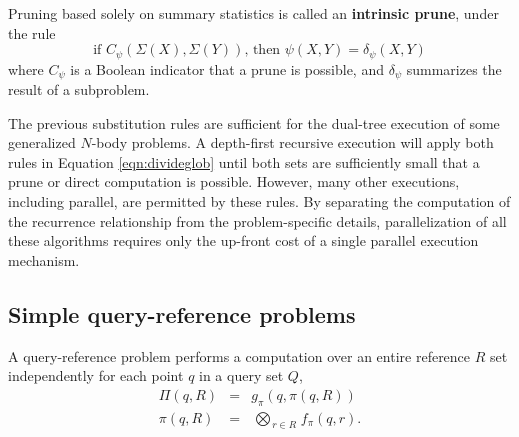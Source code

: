 \documentclass[times, 10pt,twocolumn]{article}
\newcommand{\defterm}[1]{{\bf #1}}
\newcommand{\myOp}[1]{\mathop{\bigotimes\nolimits\!\!_{#1}}}
\newcommand{\letterglob}{\psi}
\newcommand{\inglob}{\psi}
\newcommand{\canpruneglob}{C_{\letterglob}}
\newcommand{\deltaglob}{\delta_{\letterglob}}
\newcommand{\letterqr}{\pi}
\newcommand{\outqr}{\Pi}
\newcommand{\inqr}{\pi}
\newcommand{\Opqr}{\myOp{\letterqr}}
\newcommand{\fqr}{f_{\letterqr}}
\newcommand{\gqr}{g_{\letterqr}}
\newcommand{\outstat}{\Sigma}
\begin{document}
Pruning based solely on summary statistics is called an \defterm{intrinsic prune}, under the rule
\begin{equation}
\text{if } \canpruneglob(\outstat(X), \outstat(Y)) \text{, then } \inglob(X, Y) = \deltaglob(X, Y)
\label{eqn:intrinsic}
\end{equation}
\noindent where $\canpruneglob$ is a Boolean indicator that a prune is possible, and $\deltaglob$ summarizes the result of a subproblem.

\noindent The previous substitution rules are sufficient for the dual-tree execution of some generalized $N$-body problems.
A depth-first recursive execution will apply both rules in Equation \ref{eqn:divideglob} until both sets are sufficiently small that a prune or direct computation is possible.
However, many other executions, including parallel, are permitted by these rules.
By separating the computation of the recurrence relationship from the problem-specific details, parallelization of all these algorithms requires only the up-front cost of a single parallel execution mechanism.


\subsection{Simple query-reference problems}

A query-reference problem performs a computation over an entire reference $R$ set independently for each point $q$ in a query set $Q$,
\begin{eqnarray}
\outqr(q, R) &=& \gqr(q, \inqr(q, R))
\\
\inqr(q, R) &=& \Opqr_{r \in R} \fqr(q, r).
\end{eqnarray}
\end{document}

